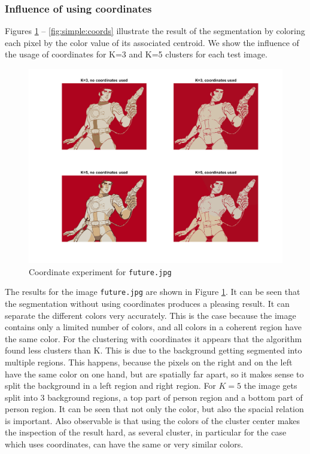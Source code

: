 \subsubsection{Influence of using coordinates}

Figures \ref{fig:future:coords} -- \ref{fig:simple:coords} illustrate the result of the segmentation by coloring each pixel by the color value of its associated centroid. We show the influence of the usage of coordinates for K=3 and K=5 clusters for each test image.

\begin{figure}[h!]
\centering
\includegraphics[width = 0.95\linewidth]{figures/task2/future_coordinates.png}
\caption{Coordinate experiment for \texttt{future.jpg}}
\label{fig:future:coords}
\end{figure}

The results for the image \texttt{future.jpg} are shown in Figure \ref{fig:future:coords}. It can be seen that the segmentation without using coordinates produces a pleasing result. It can separate the different colors very accurately. This is the case because the image contains only a limited number of colors, and all colors in a coherent region have the same color. For the clustering with coordinates it appears that the algorithm found less clusters than K. This is due to the background getting segmented into multiple regions. This happens, because the pixels on the right and on the left have the same color on one hand, but are spatially far apart, so it makes sense to split the background in a left region and right region. For $K=5$ the image gets split into 3 background regions, a top part of person region and a bottom part of person region. It can be seen that not only the color, but also the spacial relation is important. Also observable is that using the colors of the cluster center makes the inspection of the result hard, as several cluster, in particular for the case which uses coordinates, can have the same or very similar colors.

